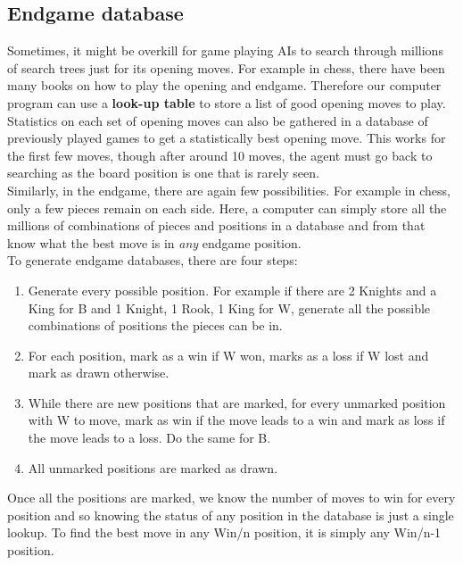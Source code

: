 \documentclass{article}
\newcommand{\n}[0]{\\[\baselineskip]}
\begin{document}
\subsection{Endgame database}
Sometimes, it might be overkill for game playing AIs to search through millions of search trees just for its opening moves. For example in chess, there have been many books on how to play the opening and endgame. Therefore our computer program can use a \textbf{look-up table} to store a list of good opening moves to play. Statistics on each set of opening moves can also be gathered in a database of previously played games to get a statistically best opening move. This works for the first few moves, though after around 10 moves, the agent must go back to searching as the board position is one that is rarely seen. 
\n
Similarly, in the endgame, there are again few possibilities. For example in chess, only a few pieces remain on each side. Here, a computer can simply store all the millions of combinations of pieces and positions in a database and from that know what the best move is in \textit{any} endgame position. 
\n
To generate endgame databases, there are four steps:
\begin{enumerate}
\item Generate every possible position. For example if there are 2 Knights and a King for B and 1 Knight, 1 Rook, 1 King for W, generate all the possible combinations of positions the pieces can be in. 
\item For each position, mark as a win if W won, marks as a loss if W lost and mark as drawn otherwise.
\item While there are new positions that are marked, for every unmarked position with W to move, mark as win if the move leads to a win and mark as loss if the move leads to a loss. Do the same for B.
\item All unmarked positions are marked as drawn.
\end{enumerate}
Once all the positions are marked, we know the number of moves to win for every position and so knowing the status of any position in the database is just a single lookup. To find the best move in any Win/n position, it is simply any Win/n-1 position. 
\end{document}
